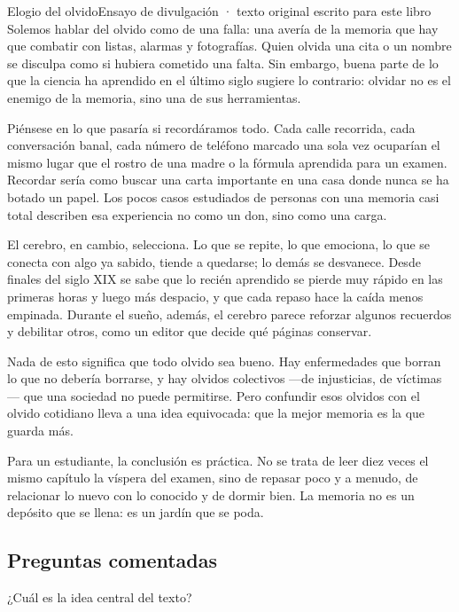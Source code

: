 \begin{texto}{Elogio del olvido}{Ensayo de divulgación · texto original escrito para este libro}
\pa Solemos hablar del olvido como de una falla: una avería de la memoria que hay que combatir con listas, alarmas y
fotografías. Quien olvida una cita o un nombre se disculpa como si hubiera cometido una falta. Sin embargo, buena parte de
lo que la ciencia ha aprendido en el último siglo sugiere lo contrario: olvidar no es el enemigo de la memoria, sino una de
sus herramientas.

\pa Piénsese en lo que pasaría si recordáramos todo. Cada calle recorrida, cada conversación banal, cada número de
teléfono marcado una sola vez ocuparían el mismo lugar que el rostro de una madre o la fórmula aprendida para un examen.
Recordar sería como buscar una carta importante en una casa donde nunca se ha botado un papel. Los pocos casos estudiados
de personas con una memoria casi total describen esa experiencia no como un don, sino como una carga.

\pa El cerebro, en cambio, selecciona. Lo que se repite, lo que emociona, lo que se conecta con algo ya sabido, tiende a
quedarse; lo demás se desvanece. Desde finales del siglo XIX se sabe que lo recién aprendido se pierde muy rápido en las
primeras horas y luego más despacio, y que cada repaso hace la caída menos empinada. Durante el sueño, además, el cerebro
parece reforzar algunos recuerdos y debilitar otros, como un editor que decide qué páginas conservar.

\pa Nada de esto significa que todo olvido sea bueno. Hay enfermedades que borran lo que no debería borrarse, y hay
olvidos colectivos —de injusticias, de víctimas— que una sociedad no puede permitirse. Pero confundir esos olvidos con el
olvido cotidiano lleva a una idea equivocada: que la mejor memoria es la que guarda más.

\pa Para un estudiante, la conclusión es práctica. No se trata de leer diez veces el mismo capítulo la víspera del
examen, sino de repasar poco y a menudo, de relacionar lo nuevo con lo conocido y de dormir bien. La memoria no es un
depósito que se llena: es un jardín que se poda.
\end{texto}

\subsection{Preguntas comentadas}
\begin{comentada}{¿Cuál es la idea central del texto?}
\end{comentada}

